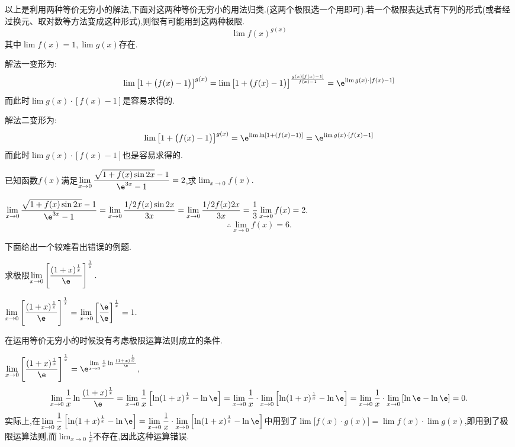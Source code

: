 \inference[等价无穷小类型\uppercase\expandafter{\romannumeral1}]
以上是利用两种等价无穷小的解法,下面对这两种等价无穷小的用法归类.(这两个极限选一个用即可).若一个极限表达式有下列的形式(或者经过换元、取对数等方法变成这种形式),则很有可能用到这两种极限.
\begin{equation}
	\lim f(x)^{g(x)}
\end{equation}
其中$\lim f(x)=1,\lim g(x)$存在.

解法一\qquad 变形为:
\begin{equation}
	\lim\big[1+\big(f(x)-1\big)\big]^{g(x)}=\lim\big[1+\big(f(x)-1\big)\big]^{\frac{g(x)[f(x)-1]}{f(x)-1}}=\e^{\lim g(x)\cdot [f(x)-1]}
\end{equation}
而此时$\lim g(x) \cdot [f(x)-1]$是容易求得的.


解法二\qquad 变形为:
\begin{equation}
	\lim\big[1+\big(f(x)-1\big)\big]^{g(x)}=\e^{\lim \ln[1+\left( f(x)-1\right) ]}=\e^{\lim g(x)\cdot [f(x)-1]}
\end{equation}
而此时$\lim g(x) \cdot [f(x)-1]$也是容易求得的.

\examples 已知函数$f(x)$满足$\displaystyle \lim_{x \to 0}\frac{\sqrt{1+f(x)\sin 2x}-1}{\e^{3x}-1}=2$,求$\displaystyle \lim_{x \to 0}f(x).$

\solve $\displaystyle \lim_{x \to 0}\frac{\sqrt{1+f(x)\sin 2x}-1}{\e^{3x}-1}=\lim\limits_{x \to 0}\frac{1/2f(x)\sin 2x}{3x}=\lim_{x \to 0}\frac{1/2f(x)2x}{3x}=\frac{1}{3}\lim_{x\to 0}f(x)=2.$
\[
\therefore \lim_{x \to 0}f(x)=6.
\]

下面给出一个较难看出错误的例题.

\examples \label{例 1.12}求极限$\displaystyle \lim_{x \to 0}\left[ \frac{(1+x)^{\frac{1}{x}}}{\e}\right]^{\frac{1}{x}}.$

\errsolve $\displaystyle \lim_{x \to 0}\left[ \frac{(1+x)^{\frac{1}{x}}}{\e}\right]^{\frac{1}{x}}=\lim_{x \to 0}\left[ \frac{\e}{\e}\right]^{\frac{1}{x}}=1.$

\errreason 在运用等价无穷小的时候没有考虑极限运算法则成立的条件.

\solvereason $\displaystyle \lim_{x \to 0}\left[ \frac{(1+x)^{\frac{1}{x}}}{\e}\right]^{\frac{1}{x}}=\e^{\lim\limits_{x \to 0}\frac{1}{x}\ln\frac{(1+x)^{\frac{1}{x}}}{\e}},$
\[
\lim_{x \to 0}\frac{1}{x}\ln\frac{(1+x)^{\frac{1}{x}}}{\e}=\lim\limits_{x \to 0}\frac{1}{x}\left[ \ln(1+x)^{\frac{1}{x}} -\ln \e\right]=\lim\limits_{x \to 0}\frac{1}{x}\cdot\lim\limits_{x \to 0}\left[ \ln(1+x)^{\frac{1}{x}} -\ln \e\right]=\lim_{x \to 0}\frac{1}{x} \cdot \lim\limits_{x \to 0} \left[ \ln \e -\ln \e \right]=0.
\]
实际上,在$\displaystyle \lim\limits_{x \to 0}\frac{1}{x}\left[ \ln(1+x)^{\frac{1}{x}}-\ln \e \right]=\lim\limits_{x \to 0}\frac{1}{x}\cdot\lim\limits_{x \to 0}\left[ \ln(1+x)^{\frac{1}{x}} -\ln \e\right]$中用到了$\lim \big[f(x)\cdot g(x)\big]=\lim f(x) \cdot \lim  g(x)$,即用到了极限运算法则,而$\displaystyle \lim_{x \to 0}\frac{1}{x}$不存在,因此这种运算错误.

